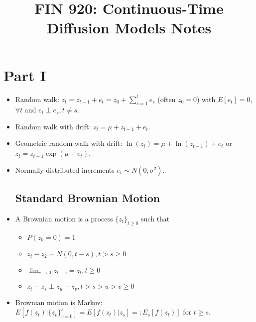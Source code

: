 \documentclass{article}
\title{FIN 920: Continuous-Time Diffusion Models Notes}
\begin{document}
\maketitle

\section{Part I}

\begin{itemize}

\subsection*{(Discrete) Random Walks}

\item Random walk: $z_t = z_{t-1} + e_t = z_0 + \sum_{s=1}^t e_s$ (often $z_0 = 0$) with $E[e_t] = 0$, $\forall t$ and $e_t \perp e_s, t \neq s$.

\item Random walk with drift: $z_t = \mu + z_{t-1} + e_t$.

\item Geometric random walk with drift: $\ln(z_t) = \mu + \ln(z_{t-1}) + e_t$ or $z_t = z_{t-1} \exp(\mu + e_t)$.

\item Normally distributed increments $e_t \sim N(0, \sigma^2)$.

\subsection*{Standard Brownian Motion}

\item A Brownian motion is a process $\{z_t\}_{t \ge 0}$ such that

\begin{itemize}

\item $P(z_0 = 0) = 1$
\item $z_t - z_2 \sim N(0, t-s), t>s \ge 0$
\item $\lim_{e \to 0} z_{t-e} = z_t, t \ge 0$
\item $z_t - z_s \perp z_u - z_v, t >s>u>v\ge 0$

\end{itemize}

\item Brownian motion is Markov: $E[f(z_t) | \{z_v\}_{v=0}^s] =E[f(z_t) | z_s]=:E_s[f(z_t)]$ for $t \ge s$.


\end{itemize}
\end{document}
